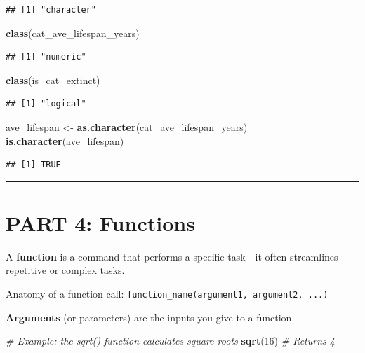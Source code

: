 \documentclass[
]{article}
\newenvironment{Shaded}{\begin{snugshade}}{\end{snugshade}}
\newcommand{\CommentTok}[1]{\textcolor[rgb]{0.56,0.35,0.01}{\textit{#1}}}
\newcommand{\DecValTok}[1]{\textcolor[rgb]{0.00,0.00,0.81}{#1}}
\newcommand{\FunctionTok}[1]{\textcolor[rgb]{0.13,0.29,0.53}{\textbf{#1}}}
\newcommand{\NormalTok}[1]{#1}
\newcommand{\OtherTok}[1]{\textcolor[rgb]{0.56,0.35,0.01}{#1}}
\begin{document}
\begin{verbatim}
## [1] "character"
\end{verbatim}

\begin{Shaded}
\begin{Highlighting}[]
\FunctionTok{class}\NormalTok{(cat\_ave\_lifespan\_years)}
\end{Highlighting}
\end{Shaded}

\begin{verbatim}
## [1] "numeric"
\end{verbatim}

\begin{Shaded}
\begin{Highlighting}[]
\FunctionTok{class}\NormalTok{(is\_cat\_extinct)}
\end{Highlighting}
\end{Shaded}

\begin{verbatim}
## [1] "logical"
\end{verbatim}

\begin{Shaded}
\begin{Highlighting}[]
\NormalTok{ave\_lifespan }\OtherTok{\textless{}{-}} \FunctionTok{as.character}\NormalTok{(cat\_ave\_lifespan\_years)}
\FunctionTok{is.character}\NormalTok{(ave\_lifespan)}
\end{Highlighting}
\end{Shaded}

\begin{verbatim}
## [1] TRUE
\end{verbatim}

\begin{center}\rule{0.5\linewidth}{0.5pt}\end{center}

\section{PART 4: Functions}\label{part-4-functions}

A \textbf{function} is a command that performs a specific task - it
often streamlines repetitive or complex tasks.

Anatomy of a function call:
\texttt{function\_name(argument1,\ argument2,\ ...)}

\textbf{Arguments} (or parameters) are the inputs you give to a
function.

\begin{Shaded}
\begin{Highlighting}[]
\CommentTok{\# Example: the sqrt() function calculates square roots}
\FunctionTok{sqrt}\NormalTok{(}\DecValTok{16}\NormalTok{)      }\CommentTok{\# Returns 4}
\end{Highlighting}
\end{Shaded}
\end{document}
